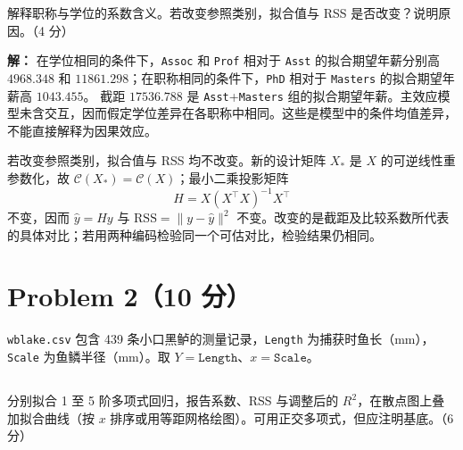 \documentclass[12pt,a4paper]{article}
\begin{document}
解释职称与学位的系数含义。若改变参照类别，拟合值与 RSS 是否改变？说明原因。（4 分）

\begin{answerbox}
\textbf{解：}
在学位相同的条件下，\texttt{Assoc} 和 \texttt{Prof} 相对于 \texttt{Asst} 的拟合期望年薪分别高 $4968.348$ 和 $11861.298$；在职称相同的条件下，\texttt{PhD} 相对于 \texttt{Masters} 的拟合期望年薪高 $1043.455$。
截距 $17536.788$ 是 \texttt{Asst}+\texttt{Masters} 组的拟合期望年薪。主效应模型未含交互，因而假定学位差异在各职称中相同。这些是模型中的条件均值差异，不能直接解释为因果效应。

若改变参照类别，拟合值与 RSS 均不改变。新的设计矩阵 $X_*$ 是 $X$ 的可逆线性重参数化，故 $\mathcal C(X_*)=\mathcal C(X)$；最小二乘投影矩阵
$$
H=X(X^\top X)^{-1}X^\top
$$
不变，因而 $\hat y=Hy$ 与 $\mathrm{RSS}=\|y-\hat y\|^2$ 不变。改变的是截距及比较系数所代表的具体对比；若用两种编码检验同一个可估对比，检验结果仍相同。

\end{answerbox}

\section{Problem 2（10 分）}

\texttt{wblake.csv} 包含 439 条小口黑鲈的测量记录，\texttt{Length} 为捕获时鱼长（mm），\texttt{Scale} 为鱼鳞半径（mm）。取 $Y=\texttt{Length}$、$x=\texttt{Scale}$。

\subsection{}

分别拟合 1 至 5 阶多项式回归，报告系数、RSS 与调整后的 $R^2$，在散点图上叠加拟合曲线（按 $x$ 排序或用等距网格绘图）。可用正交多项式，但应注明基底。（6 分）
\end{document}
